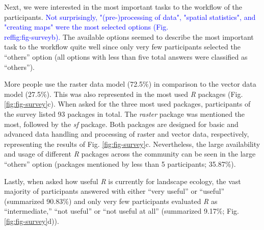 \documentclass[smallextended]{svjour3}       %
\begin{document}
Next, we were interested in the most important tasks to the workflow of the participants.
\textcolor{blue}{Not surprisingly, "(pre-)processing of data", "spatial statistics", and "creating maps" were the most selected options (Fig. \\ref{fig:fig-survey}b).}
The available options seemed to describe the most important task to the workflow quite well since only very few participants selected the ``others'' option (all options with less than five total answers were classified as ``others'').

More people use the raster data model (72.5\%) in comparison to the vector data model (27.5\%).
This was also represented in the most used \emph{R} packages (Fig. \ref{fig:fig-survey}c).
When asked for the three most used packages, participants of the survey listed 93 packages in total.
The \emph{raster} package was mentioned the most, followed by the \emph{sf} package.
Both packages are designed for basic and advanced data handling and processing of raster and vector data, respectively, representing the results of Fig. \ref{fig:fig-survey}c.
Nevertheless, the large availability and usage of different \emph{R} packages across the community can be seen in the large ``others'' option (packages mentioned by less than 5 participants; 35.87\%).

Lastly, when asked how useful \emph{R} is currently for landscape ecology, the vast majority of participants answered with either ``very useful'' or ``useful'' (summarized 90.83\%) and only very few participants evaluated \emph{R} as ``intermediate,'' ``not useful'' or ``not useful at all'' (summarized 9.17\%; Fig. \ref{fig:fig-survey}d)).
\end{document}
